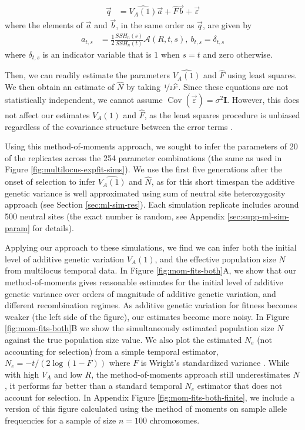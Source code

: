 \documentclass[11pt]{article}
\DeclareMathOperator{\cov}{Cov}
\newcommand{\nssh}{SSH_n}
\begin{document}
\begin{align}
 \vec{q} &= \widehat{V_A(1)} \vec{a} + \widehat{F} \vec{b} + \vec{\varepsilon}  
 \label{eq:mom-regression} 
\end{align}
where the elements of $\vec{a}$  and $\vec{b}$, in the same order as $\vec{q}$, are given by
\begin{align}
  a_{t,s} &= \frac{1}{2}\frac{\nssh(s)}{\nssh(t)}\mathcal{A}(R, t,s),~ b_{t,s} = \delta_{t,s}
\end{align}
%
where $\delta_{t,s}$ is an indicator variable that is $1$ when $s=t$
and zero otherwise.

Then, we can readily estimate the parameters $\widehat{V_A(1)}$ and
$\widehat{F}$ using least squares. We then obtain an estimate of $\widehat{N}$
by taking $\nicefrac{1}{2\widehat{F}}$. Since these equations are not
statistically independent, we cannot assume $\cov(\vec{\varepsilon}) = \sigma^2
\mathbf{I}$. However, this does not affect our estimates $\widehat{V_A(1)}$ and
$\widehat{F}$, as the least squares procedure is unbiased regardless of the
covariance structure between the error terms \parencite[p.
26]{Christensen2011-cg}.


Using this method-of-moments approach, we sought to infer the parameters of 20
of the replicates across the 254 parameter combinations (the same as used in
Figure \ref{fig:multilocus-expfit-sims}). We use the first five generations
after the onset of selection to infer $\widehat{V_A(1)}$ and $\widehat{N}$, as
for this short timespan the additive genetic variance is well approximated
using sum of neutral site heterozygosity approach (see Section
\ref{sec:ml-sim-res}). Each simulation replicate includes around 500 neutral
sites (the exact number is random, see Appendix \ref{sec:supp-ml-sim-param} for
details).

Applying our approach to these simulations, we find we can infer both the
initial level of additive genetic variation $V_A(1)$, and the effective
population size $N$ from multilocus temporal data. In Figure
\ref{fig:mom-fits-both}A, we show that our method-of-moments gives reasonable
estimates for the initial level of additive genetic variance over orders of
magnitude of additive genetic variation, and different recombination regimes.
As additive genetic variation for fitness becomes weaker (the left side of the
figure), our estimates become more noisy. In Figure \ref{fig:mom-fits-both}B we
show the simultaneously estimated population size $N$ against the true
population size value. We also plot the estimated $N_e$ (not accounting for
selection) from a simple temporal estimator, $N_e = -t / (2 \log(1-F))$
\parencite{Krimbas1971-et,Waples1989-sj} where $F$ is Wright's standardized
variance \parencite{Wright1931-fl}. While with high $V_A$ and low $R$, the
method-of-moments approach still underestimates $N$, it performs far better
than a standard temporal $N_e$ estimator that does not account for selection.
In Appendix Figure \ref{fig:mom-fits-both-finite}, we include a version of this
figure calculated using the method of moments on sample allele frequencies for
a sample of size $n=100$ chromosomes.
\end{document}
